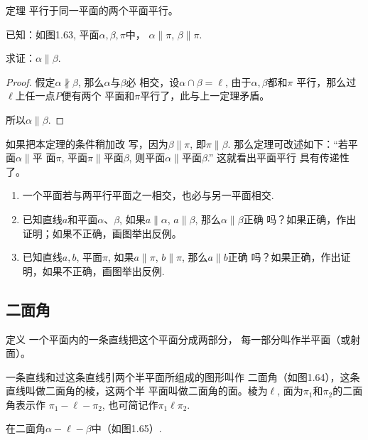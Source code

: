 \begin{blk}
  {定理} 平行于同一平面的两个平面平行。
\end{blk}


已知：如图1.63, 平面$\alpha,\beta,\pi$中，
$\alpha\parallel \pi$, $\beta\parallel \pi$.

求证：$\alpha\parallel \beta$.

\begin{proof}
  假定$\alpha\nparallel\beta$, 那么$\alpha$与$\beta$必
相交，设$\alpha\cap \beta=\ell$, 由于$\alpha,\beta$都和$\pi$
平行，那么过$\ell$上任一点$P$便有两个
平面和$\pi$平行了，此与上一定理矛盾。

所以$\alpha\parallel \beta$.
\end{proof}

\begin{rmk}
如果把本定理的条件稍加改
写，因为$\beta\parallel \pi$, 即$\pi\parallel \beta$. 那么定理可改述如下：“若平面$\alpha\parallel$平
面$\pi$, 平面$\pi\parallel$平面$\beta$, 则平面$\alpha\parallel$平面$\beta$.” 这就看出平面平行
具有传递性了。
\end{rmk}

\begin{ex}
\begin{enumerate}
  \item 一个平面若与两平行平面之一相交，也必与另一平面相交.
  \item 已知直线$a$和平面$\alpha$、$\beta$, 如果$a\parallel \alpha$, $a\parallel \beta$, 那么$\alpha\parallel \beta$正确
  吗？如果正确，作出证明；如果不正确，画图举出反例。
  \item 已知直线$a,b$, 平面$\pi$, 如果$a\parallel \pi$, $b\parallel \pi$, 那么$a\parallel b$正确
  吗？如果正确，作出证明，如果不正确，画图举出反例.
\end{enumerate}
\end{ex}

\subsection{二面角}
\begin{blk}
  {定义} 一个平面内的一条直线把这个平面分成两部分，
每一部分叫作半平面（或射面）。
\end{blk}

一条直线和过这条直线引两个半平面所组成的图形叫作
二面角（如图1.64），这条直线叫做二面角的棱，这两个半
平面叫做二面角的面。棱为$\ell$, 面为$\pi_1$和$\pi_2$的二面角表示作
$\pi_1-\ell-\pi_2$, 也可简记作$\pi_1\ell\pi_2$.

在二面角$\alpha-\ell-\beta$中（如图1.65）.


